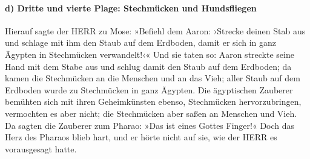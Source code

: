 \hypertarget{d-dritte-und-vierte-plage-stechmuxfccken-und-hundsfliegen}{%
\paragraph{d) Dritte und vierte Plage: Stechmücken und
Hundsfliegen}\label{d-dritte-und-vierte-plage-stechmuxfccken-und-hundsfliegen}}

 Hierauf sagte der HERR zu Mose: »Befiehl dem Aaron:
›Strecke deinen Stab aus und schlage mit ihm den Staub auf dem Erdboden,
damit er sich in ganz Ägypten in Stechmücken verwandelt!‹«
 Und sie taten so: Aaron streckte seine Hand mit dem
Stabe aus und schlug damit den Staub auf dem Erdboden; da kamen die
Stechmücken an die Menschen und an das Vieh; aller Staub auf dem
Erdboden wurde zu Stechmücken in ganz Ägypten.  Die
ägyptischen Zauberer bemühten sich mit ihren Geheimkünsten ebenso,
Stechmücken hervorzubringen, vermochten es aber nicht; die Stechmücken
aber saßen an Menschen und Vieh.  Da sagten die Zauberer
zum Pharao: »Das ist eines Gottes Finger!« Doch das Herz des Pharaos
blieb hart, und er hörte nicht auf sie, wie der HERR es vorausgesagt
hatte.

